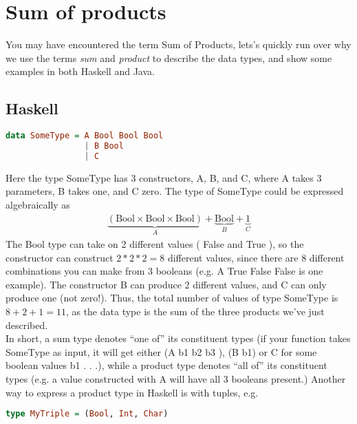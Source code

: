     \section{Sum of products}
        You may have encountered the term \gls{Sum of Products}, lets's quickly run over why we use the terms \textit{sum} and \textit{product} 
        to describe the data types, and show some examples in both Haskell and Java.

        \subsection*{Haskell}
            \begin{lstlisting}[language=Haskell]
data SomeType = A Bool Bool Bool
                | B Bool
                | C
            \end{lstlisting}
            Here the type SomeType has 3 constructors, A, B, and C, where A takes 3 parameters, B takes one, and C zero. 
            The type of SomeType could be expressed algebraically as
            \begin{align*}
                \underbrace{(\text{Bool} \times \text{Bool} \times \text{Bool})}_{A} + \underbrace{\text{Bool}}_{B} + \underbrace{1}_{C}
            \end{align*}
            The Bool type can take on 2 different values
            ( False and True ), so the constructor
            can construct $2 * 2 * 2 = 8$ different values, since there are 8 different combinations you can
            make from 3 booleans (e.g. A True False False is one example). The constructor B can
            produce 2 different values, and C can only produce one (not zero!).
            Thus, the total number of values of type SomeType is $8 + 2 + 1 = 11$, as the data type
            is the sum of the three products we've just described.\\
            In short, a sum type denotes “one of” its constituent types (if your function takes SomeType
            as input, it will get either (A b1 b2 b3 ), (B b1) or C for some boolean values b1 . . .), while
            a product type denotes “all of” its constituent types (e.g. a value constructed with A will
            have all 3 booleans present.) Another way to express a product type in Haskell is with tuples,
            e.g.
            \begin{lstlisting}[language=Haskell]
type MyTriple = (Bool, Int, Char)
            \end{lstlisting}

